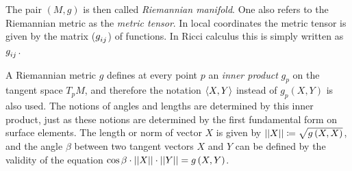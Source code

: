 \documentclass[../main.tex]{subfiles}
\begin{document}
\begin{remark}\label{Manifold:Riemannian}
The pair $\left(M,g\right)$ is then called \textit{Riemannian manifold}.
One also refers to the Riemannian metric as the \textit{metric tensor}.
In local coordinates the metric tensor is given by the matrix ($\tensor{g}{_i_j}$) of functions.
In Ricci calculus this is simply written as $\tensor{g}{_i_j}$.
{\autocite[][Chapter~5C]{kuhnelwolfgang_2006}}
\end{remark}
\begin{remark}\label{Manifold:InnerProduct}
A Riemannian metric $g$ defines at every point $p$
an \textit{inner product} $g_p$ on the tangent space $T_pM$,
and therefore the notation $\left\langle{X},{Y}\right\rangle$ instead of $g_p\left(X,Y\right)$ is also used.
The notions of angles and lengths are determined by this inner product,
just as these notions are determined by the first fundamental form on surface elements.
The length or norm of vector $X$ is given by $\left|\left|{X}\right|\right|\coloneqq\sqrt{g\left(X,X\right)}$,
and the angle $\beta$ between two tangent vectors $X$ and $Y$
can be defined by the validity of the equation $\cos\beta\cdot\left|\left|{X}\right|\right|\cdot\left|\left|{Y}\right|\right|=g\left(X,Y\right)$.
{\autocite[][Chapter~5C]{kuhnelwolfgang_2006}}
\end{remark}
\end{document}
